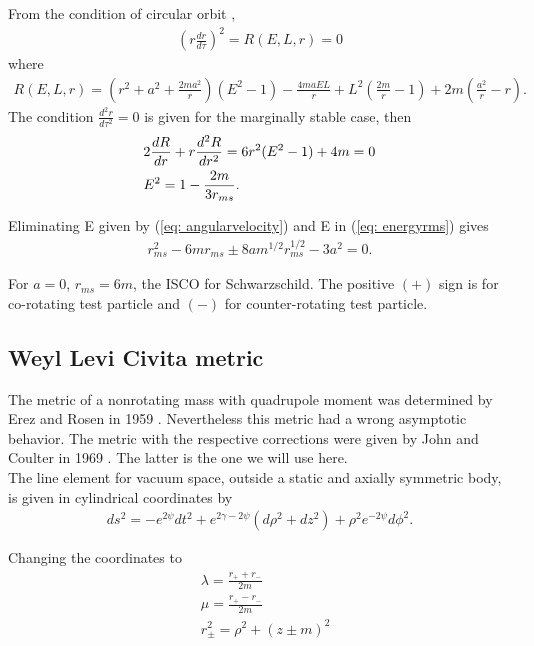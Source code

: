 From the condition of circular orbit \cite{Raine},
\begin{align}
 \left(r \frac{dr}{d\tau}\right) ^2 = R(E,L,r) = 0
\end{align}
where
\begin{align}
 R(E,L,r) = \left(r^2 + a^2 + \frac{2ma^2}{r}\right)(E^2-1) -\frac{4maEL}{r} + L^2 \left(\frac{2m}{r}-1\right) + 2m \left(\frac{a^2}{r}-r\right).
\end{align}
The condition $\frac{d^2r}{d\tau^2} = 0$ is given for the marginally stable case, then
\begin{align}\notag
&2\frac{dR}{dr} + r\frac{d^2R}{dr^2} = 6r^2(E^2-1)+4m =0\\
\label{eq: energyrms}
&E^2 = 1-\frac{2m}{3r_{ms}}.
\end{align}

Eliminating E given by (\ref{eq: angularvelocity}) and E in (\ref{eq: energyrms}) gives
\begin{align}
	r^2_{ms} - 6mr_{ms} \pm 8am^{1/2}r^{1/2}_{ms} - 3a^2 = 0.
\end{align}

For $a = 0$, $r_{ms} = 6m$, the ISCO for Schwarzschild. The positive $(+)$ sign is for co-rotating test particle and $(-)$ for counter-rotating test particle.

\subsection{Weyl Levi Civita metric}

The metric of a nonrotating mass with quadrupole moment was determined by Erez and Rosen in 1959 \cite{erezandrosen}. Nevertheless this metric had a wrong asymptotic behavior. The metric with the respective corrections were given by John and Coulter in 1969 \cite{johnandcoulter}. The latter is the one we will use here.\\

The line element for vacuum space, outside a static and axially symmetric body, is given in cylindrical coordinates by
\begin{align}
	ds^2 = -e^{2\psi}dt^2 +  e^{2\gamma -2\psi} (d\rho^2 + dz^2)  + \rho^2 e^{-2\psi}d\phi^2.
\end{align}

Changing the coordinates to
\begin{subequations}
\begin{align*}
	&\lambda  = \frac{r_+ + r_-}{2m}\\
	&\mu  = \frac{r_+ - r_-}{2m}\\
	&r_{\pm}^2 = \rho^2 + (z \pm m)^2
\end{align*}
\end{subequations}

